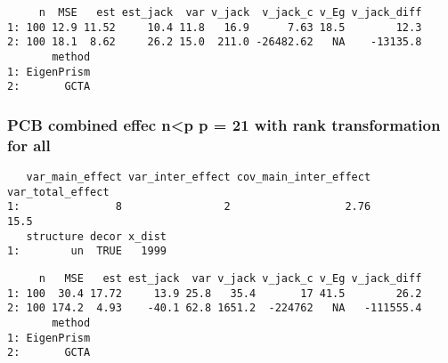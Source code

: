 \documentclass[]{article}
\begin{document}
\begin{verbatim}
     n  MSE   est est_jack  var v_jack  v_jack_c v_Eg v_jack_diff
1: 100 12.9 11.52     10.4 11.8   16.9      7.63 18.5        12.3
2: 100 18.1  8.62     26.2 15.0  211.0 -26482.62   NA    -13135.8
       method
1: EigenPrism
2:       GCTA
\end{verbatim}

\subsubsection{PCB combined effec n\textless{}p p = 21 with rank
transformation for
all}\label{pcb-combined-effec-np-p-21-with-rank-transformation-for-all}

\begin{verbatim}
   var_main_effect var_inter_effect cov_main_inter_effect var_total_effect
1:               8                2                  2.76             15.5
   structure decor x_dist
1:        un  TRUE   1999
\end{verbatim}

\begin{verbatim}
     n   MSE   est est_jack  var v_jack v_jack_c v_Eg v_jack_diff
1: 100  30.4 17.72     13.9 25.8   35.4       17 41.5        26.2
2: 100 174.2  4.93    -40.1 62.8 1651.2  -224762   NA   -111555.4
       method
1: EigenPrism
2:       GCTA
\end{verbatim}
\end{document}
